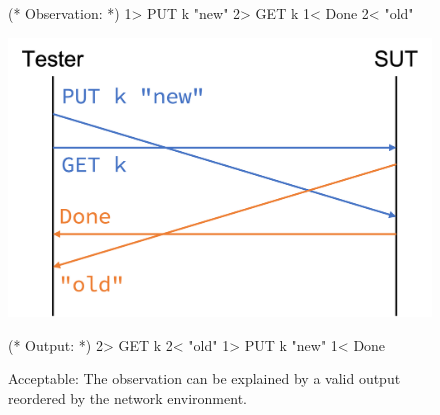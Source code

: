 \begin{figure}
  \centering
  \begin{minipage}[c]{.3\textwidth}
\begin{coq}
  (* Observation: *)
  1> PUT k "new"
  2> GET k
  1< Done
  2< "old"
\end{coq}
  \end{minipage}\begin{minipage}[c]{.4\textwidth}
    \includegraphics[width=\linewidth]{figures/network-trace}
  \end{minipage}\begin{minipage}[c]{.3\textwidth}
\begin{coq}
  (* Output: *)
  2> GET k
  2< "old"
  1> PUT k "new"
  1< Done
\end{coq}
  \end{minipage}
  \caption[Reordered trace upon network delays.]{Acceptable: The observation can
    be explained by a valid output reordered by the network environment.}
  \label{fig:reordered-trace}
\end{figure}
